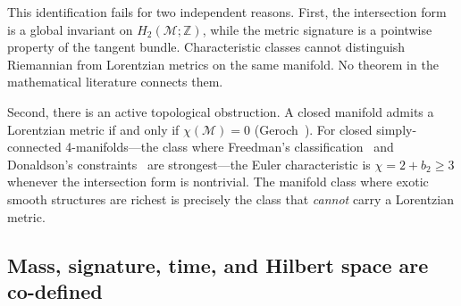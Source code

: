 \documentclass[12pt,a4paper]{article}
\theoremstyle{definition}
\theoremstyle{remark}
\begin{document}
This identification fails for two independent reasons. First, the intersection
form is a global invariant on $H_2(\mathcal{M};\mathbb{Z})$, while the metric
signature is a pointwise property of the tangent bundle. Characteristic classes
cannot distinguish Riemannian from Lorentzian metrics on the same manifold. No
theorem in the mathematical literature connects them.

Second, there is an active topological obstruction. A closed manifold admits a
Lorentzian metric if and only if $\chi(\mathcal{M}) = 0$
(Geroch~\cite{geroch}). For closed simply-connected 4-manifolds---the class
where Freedman's classification~\cite{freedman} and Donaldson's
constraints~\cite{donaldson} are strongest---the Euler characteristic is
$\chi = 2 + b_2 \geq 3$ whenever the intersection form is nontrivial. The
manifold class where exotic smooth structures are richest is precisely the
class that \emph{cannot} carry a Lorentzian metric.

\subsection{Mass, signature, time, and Hilbert space are co-defined}
\end{document}
